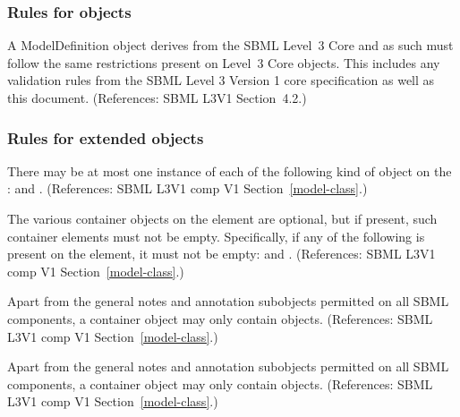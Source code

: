 \begin{sbmlenum}
\end{sbmlenum} \subsubsection*{Rules for  objects} \begin{sbmlenum}

 { A ModelDefinition object derives from the SBML
  Level~3 Core  and as such must follow the same restrictions 
  present on Level~3 Core \Model objects.
  This includes any validation rules from the SBML Level 3 Version 1
  core specification as well as this document.
   (References: SBML L3V1 Section~4.2.) }

\end{sbmlenum} \subsubsection*{Rules for extended  objects} \begin{sbmlenum}

 { There may be at most one instance of each of the
  following kind of object on the \Model: \ListOfSubmodels and \ListOfPorts. 
  (References: SBML L3V1 comp V1 Section~\ref{model-class}.) }


 { The various  container objects on 
  the \Model element are optional, but if present, such 
  container elements must not be empty. Specifically, if any of the following 
  is present on the \Model element, it must not be empty: 
  \ListOfSubmodels and \ListOfPorts.
  (References: SBML L3V1 comp V1 Section~\ref{model-class}.) }
  

 { Apart from the general notes and annotation
  subobjects permitted on all SBML components, a \ListOfSubmodels
  container object may only contain \Submodel objects.
  (References: SBML L3V1 comp V1 Section~\ref{model-class}.) }


 { Apart from the general notes and annotation
  subobjects permitted on all SBML components, a
  \ListOfPorts container object may only contain \Port objects.
  (References: SBML L3V1 comp V1 Section~\ref{model-class}.) }
  




\end{sbmlenum}
